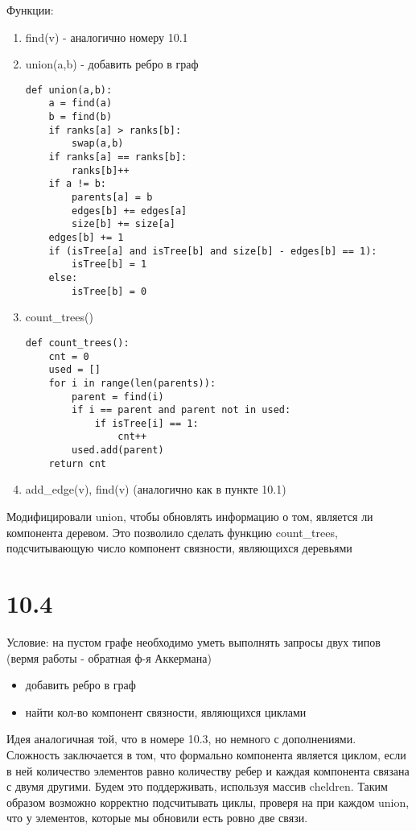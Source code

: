 \documentclass[12pt]{article}
\begin{document}
Функции:
\begin{enumerate}
    \item find(v) - аналогично номеру 10.1
    \item union(a,b) - добавить ребро в граф
\begin{lstlisting}
def union(a,b):
    a = find(a)
    b = find(b)
    if ranks[a] > ranks[b]:
        swap(a,b)
    if ranks[a] == ranks[b]:
        ranks[b]++
    if a != b:
        parents[a] = b
        edges[b] += edges[a]
        size[b] += size[a]
    edges[b] += 1
    if (isTree[a] and isTree[b] and size[b] - edges[b] == 1):
        isTree[b] = 1
    else:
        isTree[b] = 0
\end{lstlisting}
\item count\_trees()
\begin{lstlisting}
def count_trees():
    cnt = 0
    used = []
    for i in range(len(parents)):
        parent = find(i)
        if i == parent and parent not in used:
            if isTree[i] == 1:
                cnt++
        used.add(parent)
    return cnt
\end{lstlisting}
    \item add\_edge(v), find(v) (аналогично как в пункте 10.1)
\end{enumerate}

Модифицировали union, чтобы обновлять информацию о том, является ли компонента деревом. Это позволило сделать функцию count\_trees, подсчитывающую число компонент связности, являющихся деревьями

\section{10.4}
Условие: на пустом графе необходимо уметь выполнять запросы двух типов (вермя работы - обратная ф-я Аккермана)
\begin{itemize}
    \item добавить ребро в граф
    \item найти кол-во компонент связности, являющихся циклами
\end{itemize}

Идея аналогичная той, что в номере 10.3, но немного с дополнениями. Сложность заключается в том, что формально компонента является циклом, если в ней количество элементов равно количеству ребер и каждая компонента связана с двумя другими. Будем это поддерживать, используя массив cheldren. Таким образом возможно корректно подсчитывать циклы, проверя на при каждом union, что у элементов, которые мы обновили есть ровно две связи.
\end{document}
